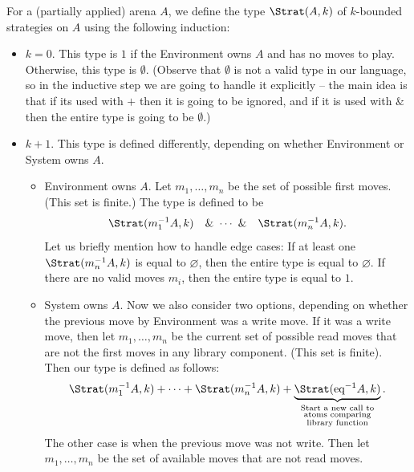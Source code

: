 \begin{definition}
    For a (partially applied) arena $A$, we define the type $\Strat(A, k)$ of $k$-bounded strategies on $A$ using the following induction:
\begin{itemize}
    \item $k=0$. This type is $1$ if the Environment owns $A$ and has no moves to play. Otherwise, this type is $\emptyset$.
          (Observe that $\emptyset$ is not a valid type in our language, so in the inductive step we are going to handle it explicitly --
          the main idea is that if its used with $+$ then it is going to be ignored,
          and if it is used with $\&$ then the entire type is going to be $\emptyset$.) 
    \item $k + 1$. This type is defined differently, depending on whether Environment or System owns $A$.
    \begin{itemize}
        \item Environment owns $A$. Let $m_1,\ldots,m_n$ be the set of possible first moves. (This set is finite.) The type is defined to be 
        \begin{align*}
            \Strat(m_1^{-1}A, k) \quad \&\  \cdots\  \& \quad  \Strat(m_n^{-1}A, k).
        \end{align*}
        Let us briefly mention how to handle edge cases: If at least one $\Strat(m_n^{-1}A, k)$ is equal to $\varnothing$, then 
        the entire type is equal to $\varnothing$. If there are no valid moves $m_i$, then the entire type is equal to $1$. 
        \item System owns $A$. Now we also consider two options, depending on whether the previous move by Environment was a write move. 
               If it was a write move, then let $m_1, \ldots, m_n$ be the current set of possible read moves that are not the first moves in any library 
               component. (This set is finite). Then our type is defined as follows:
               \begin{align*}
                \Strat(m_1^{-1}A, k) + \cdots + \Strat(m_n^{-1}A, k) + \underbrace{\Strat({\text{eq}}^{-1}A, k)}_{\substack{\textrm{Start a new call to}\\
                \textrm{atoms comparing}\\
                \textrm{library function}}}.
               \end{align*}
               The other case is when the previous move was not write. Then let $m_1, \ldots, m_n$ be the set of available moves that are not read moves. 

\end{itemize}
\end{itemize}
\end{definition}
